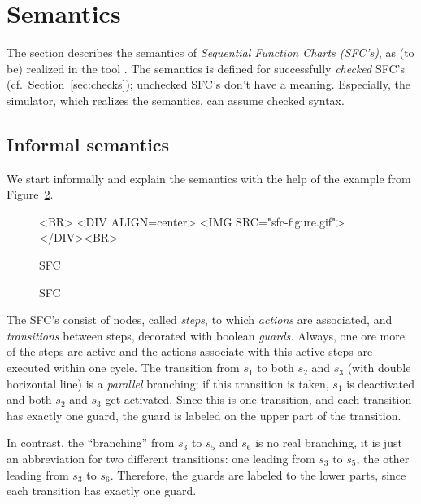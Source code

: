 \section{Semantics}
\label{sec:semantics}

The section describes the semantics of \textit{Sequential Function Charts
  (SFC's)}, as (to be) realized in the tool \Slime.  The semantics is
defined for successfully \emph{checked} SFC's (cf.\ 
Section~\ref{sec:checks}); unchecked SFC's don't have a meaning.
Especially, the simulator, which realizes the semantics, can assume checked
syntax.

\subsection{Informal semantics}
\label{sec:semantics.informal}

We start informally and explain the semantics with the help of the example
from Figure~\ref{fig:SFC}.


\ifweb
\begin{figure}[htbp]
  \centering
  \begin{rawhtml}
    <BR>
    <DIV ALIGN=center>
    <IMG SRC="sfc-figure.gif">
    </DIV><BR>  
  \end{rawhtml}  
  \caption{SFC}
  \label{fig:SFC}
\end{figure}

\else
\begin{figure}[htbp]
  \centering
  
  \caption{SFC}
  \label{fig:SFC}
\end{figure}

\fi


The SFC's consist of nodes, called \emph{steps}, to which \emph{actions} are
associated, and \emph{transitions} between steps, decorated with boolean
\emph{guards.} Always, one ore more of the steps are active and the actions
associate with this active steps are executed within one cycle.  The
transition from $s_1$ to both $s_2$ and $s_3$ (with double horizontal line) is
a \emph{parallel} branching: if this transition is taken, $s_1$ is deactivated
and both $s_2$ and $s_3$ get activated.  Since this is one transition, and
each transition has exactly one guard, the guard is labeled on the upper part
of the transition.

In contrast, the ``branching'' from $s_3$ to $s_5$ and $s_6$ is no real
branching, it is just an abbreviation for two different transitions: one
leading from $s_3$ to $s_5$, the other leading from $s_3$ to $s_6$.
Therefore, the guards are labeled to the lower parts, since each transition
has exactly one guard.

